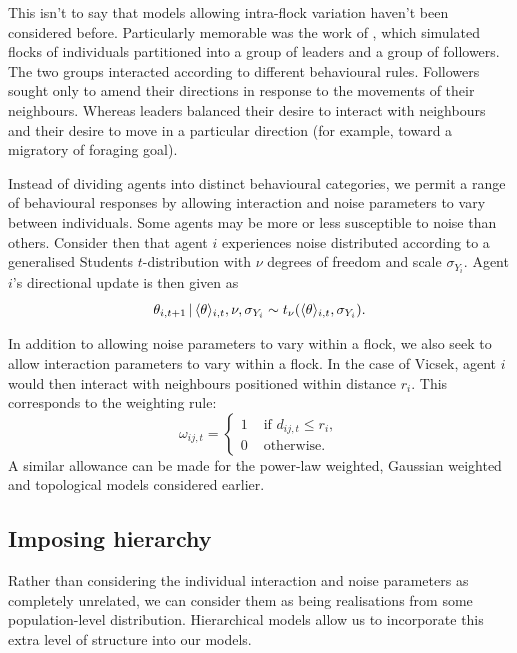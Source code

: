 This isn't to say that models allowing intra-flock variation haven't been
considered before. Particularly memorable was the work of \textcite{couzin05},
which simulated flocks of individuals partitioned into a group of leaders and a
group of followers. The two groups interacted according to different
behavioural rules. Followers sought only to amend their directions in response
to the movements of their neighbours. Whereas leaders balanced their desire to
interact with neighbours and their desire to move in a particular direction
(for example, toward a migratory of foraging goal).

Instead of dividing agents into distinct behavioural categories, we permit a
range of behavioural responses by allowing interaction and noise parameters to
vary between individuals. Some agents may be more or less susceptible to noise
than others. Consider then that agent $i$ experiences noise distributed
according to a generalised Students $t$-distribution with $\nu$ degrees of
freedom and scale $\sigma_{Y_i}$. Agent $i$'s directional update is then given
as
\begin{equation*}
  \theta_{i,t+1} \,|\, \langle\theta\rangle_{i,t}, \nu, \sigma_{Y_i} \sim
    t_{\nu}(\langle\theta\rangle_{i,t}, \sigma_{Y_i}).
\end{equation*}

In addition to allowing noise parameters to vary within a flock, we also seek
to allow interaction parameters to vary within a flock. In the case of Vicsek,
agent $i$ would then interact with neighbours positioned within distance $r_i$.
This corresponds to the weighting rule:
\begin{equation}
    \omega_{ij,t} =
    \begin{cases}
        1 & \text{ if } d_{ij, t} \leq r_i,\\
        0 & \text{ otherwise.}
    \end{cases}
\end{equation}
A similar allowance can be made for the power-law weighted, Gaussian weighted
and topological models considered earlier.

\subsection{Imposing hierarchy}
\label{ssec:hier_mod}

Rather than considering the individual interaction and noise parameters as
completely unrelated, we can consider them as being realisations from some
population-level distribution. Hierarchical models allow us to incorporate this
extra level of structure into our models.

